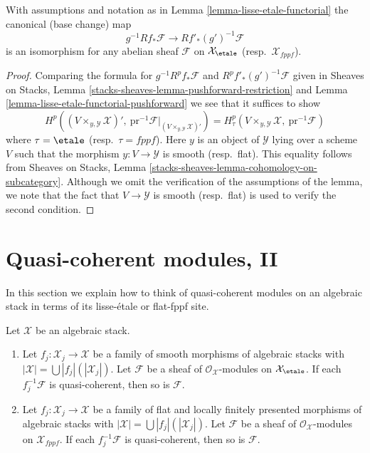 \begin{lemma}
\label{lemma-lisse-etale-functorial-cohomology}
With assumptions and notation as in Lemma \ref{lemma-lisse-etale-functorial}
the canonical (base change) map
$$
g^{-1}Rf_*\mathcal{F} \longrightarrow Rf'_*(g')^{-1}\mathcal{F}
$$
is an isomorphism for any abelian sheaf $\mathcal{F}$
on $\mathcal{X}_\etale$ (resp.\ $\mathcal{X}_{fppf}$).
\end{lemma}

\begin{proof}
Comparing the formula for $g^{-1}R^pf_*\mathcal{F}$
and $R^pf'_*(g')^{-1}\mathcal{F}$ given in
Sheaves on Stacks, Lemma \ref{stacks-sheaves-lemma-pushforward-restriction}
and Lemma \ref{lemma-lisse-etale-functorial-pushforward}
we see that it suffices to show
$$
H^p((V \times_{y, \mathcal{Y}} \mathcal{X})',
\ \text{pr}^{-1}\mathcal{F}|_{(V \times_{y, \mathcal{Y}} \mathcal{X})'})
=
H^p_\tau(V \times_{y, \mathcal{Y}} \mathcal{X},\ \text{pr}^{-1}\mathcal{F})
$$
where $\tau = \etale$ (resp.\ $\tau = fppf$). Here $y$ is an object
of $\mathcal{Y}$ lying over a scheme $V$ such that the morphism
$y : V \to \mathcal{Y}$ is smooth (resp.\ flat).
This equality follows from
Sheaves on Stacks, Lemma \ref{stacks-sheaves-lemma-cohomology-on-subcategory}.
Although we omit the verification of the assumptions
of the lemma, we note that the fact that $V \to \mathcal{Y}$ is smooth
(resp.\ flat) is used to verify the second condition.
\end{proof}






\section{Quasi-coherent modules, II}
\label{section-quasi-coherent-modules-II}

\noindent
In this section we explain how to think of quasi-coherent modules
on an algebraic stack in terms of its lisse-\'etale or flat-fppf site.

\begin{lemma}
\label{lemma-check-qc-on-etale-covering}
Let $\mathcal{X}$ be an algebraic stack.
\begin{enumerate}
\item Let $f_j : \mathcal{X}_j \to \mathcal{X}$ be a family of smooth
morphisms of algebraic stacks with
$|\mathcal{X}| =\bigcup |f_j|(|\mathcal{X}_j|)$.
Let $\mathcal{F}$ be a sheaf of $\mathcal{O}_\mathcal{X}$-modules
on $\mathcal{X}_\etale$. If each $f_j^{-1}\mathcal{F}$
is quasi-coherent, then so is $\mathcal{F}$.
\item Let $f_j : \mathcal{X}_j \to \mathcal{X}$ be a family of flat and
locally finitely presented morphisms of algebraic stacks with
$|\mathcal{X}| =\bigcup |f_j|(|\mathcal{X}_j|)$.
Let $\mathcal{F}$ be a sheaf of $\mathcal{O}_\mathcal{X}$-modules
on $\mathcal{X}_{fppf}$. If each $f_j^{-1}\mathcal{F}$
is quasi-coherent, then so is $\mathcal{F}$.
\end{enumerate}
\end{lemma}

